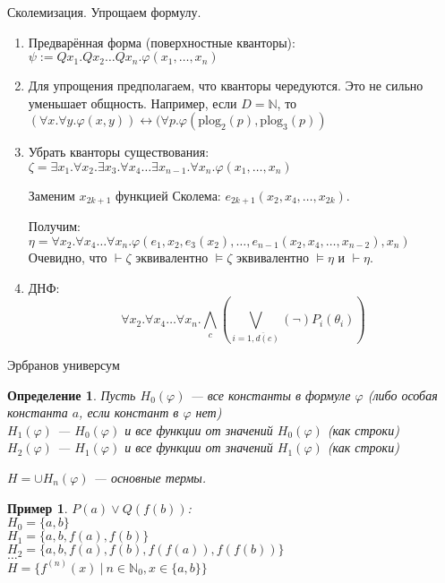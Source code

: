 \documentclass[aspectratio=169]{beamer}
\newtheorem{dfn}{Определение}[section]
\newtheorem{exm}{Пример}[section]
\begin{document}
\begin{frame}{Сколемизация. Упрощаем формулу.}
\begin{enumerate}
\item Предварённая форма (поверхностные кванторы):
$\psi := Q x_1.Q x_2\dots Q x_n.\varphi(x_1,\dots,x_n)$

\item Для упрощения предполагаем, что кванторы чередуются.
Это не сильно уменьшает общность. Например, если $D = \mathbb{N}$,
то $(\forall x.\forall y.\varphi(x,y)) \leftrightarrow (\forall p.\varphi(\text{plog}_2(p),\text{plog}_3(p))$

\item Убрать кванторы существования:
$\zeta = \exists x_1.\forall x_2.\exists x_3.\forall x_4\dots\exists x_{n-1}.\forall x_n.\varphi(x_1,\dots,x_n)$

Заменим $x_{2k+1}$ функцией Сколема: $e_{2k+1}(x_2,x_4,\dots,x_{2k})$.

Получим: $\eta = \forall x_2.\forall x_4\dots\forall x_n.\varphi(e_1,x_2,e_3(x_2),\dots,e_{n-1}(x_2,x_4,\dots,x_{n-2}),x_n)$
Очевидно, что $\vdash\zeta$ эквивалентно $\models\zeta$ эквивалентно $\models\eta$ и $\vdash\eta$.

\item ДНФ:
$$\forall x_2.\forall x_4\dots\forall x_n.\bigwedge_c\left(\bigvee_{i = \overline{1,d(c)}} (\neg)P_i(\theta_i)\right)$$

\end{enumerate}
\end{frame}

\begin{frame}{Эрбранов универсум}
\begin{dfn}Пусть $H_0(\varphi)$ --- все константы в формуле $\varphi$ (либо особая константа $a$, если констант в $\varphi$ нет)\\
$H_1(\varphi)$ --- $H_0(\varphi)$ и все функции от значений $H_0(\varphi)$ (как строки)\\
$H_2(\varphi)$ --- $H_1(\varphi)$ и все функции от значений $H_1(\varphi)$ (как строки)

$H = \cup H_n(\varphi)$ --- основные термы.
\end{dfn}

\begin{exm}$P(a)\vee Q(f(b))$: \\
$H_0 = \{a,b\}$\\
$H_1 = \{a,b,f(a),f(b)\}$\\
$H_2 = \{a,b,f(a),f(b),f(f(a)),f(f(b))\}$\\
$\dots$\\
$H = \{f^{(n)}(x)\ |\ n \in \mathbb{N}_0, x \in \{a,b\}\}$\end{exm}
\end{frame}
\end{document}
